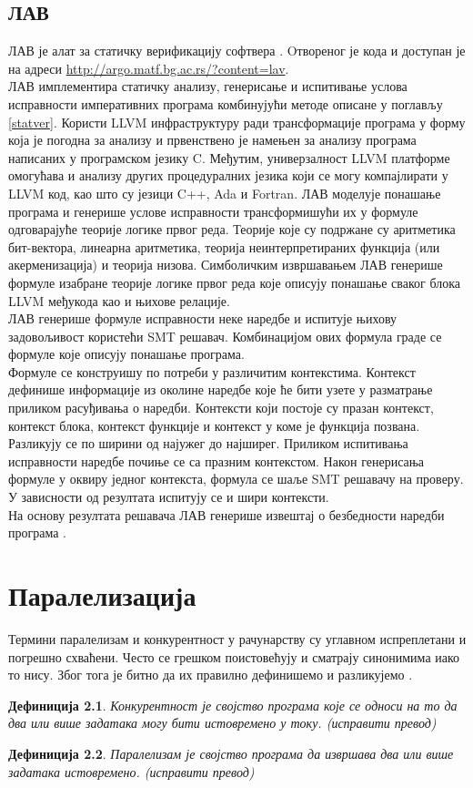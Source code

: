 \documentclass[12pt,oneside]{memoir}
\newtheorem{definic}{Дефиниција}
\begin{document}
  \section{ЛАВ}
	ЛАВ је алат за статичку верификацију софтвера \cite{mvjphd}. Oтвореног је кода и доступан је на адреси \url{http://argo.matf.bg.ac.rs/?content=lav}. 
  \\
	ЛАВ имплементира статичку анализу, генерисање и испитивање услова исправности императивних програма комбинујући методе описане у поглављу \ref{statver}. Користи LLVM инфраструктуру ради трансформације програма у форму која је погодна за анализу и првенствено је намењен за анализу програма написаних у програмском језику C. Међутим, универзалност LLVM платформе омогућава и анализу других процедуралних језика који се могу компајлирати у LLVM код, као што су језици C++, Ada и Fortran. ЛАВ моделује понашање програма и генерише услове исправности трансформишући их у формуле одговарајуће теорије логике првог реда. Теорије које су подржане су аритметика бит-вектора, линеарна аритметика, теорија неинтерпретираних функција (или акерменизација) и теорија низова.  Симболичким извршавањем ЛАВ генерише формуле изабране теорије логике првог реда које описују понашање сваког блока LLVM међукода као и њихове релације. 
	\\
	ЛАВ генерише формуле исправности неке наредбе и испитује њихову задовољивост користећи SMT решавач. Комбинацијом ових формула граде се формуле које описују понашање програма. 
	\\
	 Формуле се конструишу по потреби у различитим контекстима. Контекст дефинише информације из околине наредбе које ће бити узете у разматрање приликом расуђивања о наредби. Контексти који постоје су празан контекст, контекст блока, контекст функције и контекст у коме је функција позвана. Разликују се по ширини од најужег до најширег. Приликом испитивања исправности наредбе почиње се са празним контекстом.  Након генерисања формуле у оквиру једног контекста, формула се шаље SMT решавачу на проверу. У зависности од резултата испитују се и шири контексти. 
\\	
 На основу резултата решавача ЛАВ генерише извештај о безбедности наредби програма \cite{mvjdev}. 	
	 
	
\chapter{Паралелизација}
	Термини паралелизам и конкурентност у рачунарству су углавном испреплетани и погрешно схваћени. Често се грешком поистовећују и сматрају синонимима иако то нису. Због тога је битно да их правилно дефинишемо и разликујемо \cite{par_computing}.
\begin{definic}
	Конкурентност је својство програма које се односи на то да два или више задатака могу бити истовремено у току. (исправити превод)
\end{definic}
\begin{definic}
	Паралелизам је својство програма да извршава два или више задатака истовремено. (исправити превод)
\end{definic}
\end{document}

